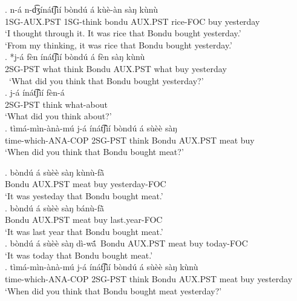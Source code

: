 \documentclass{assets/fieldnotes}
\begin{document}

\exg. n-á n-d͡ʒínát͡ʃìí bòndú á kùè-àn sàŋ kùnù\\
1SG-AUX.PST 1SG-think bondu AUX.PST rice-FOC buy yesterday\\
`I thought through it. It was rice that Bondu bought yesterday.' \\  
`From my thinking, it was rice that Bondu bought yesterday.' \\ 

\exg. *j-á fèn ínát͡ʃìí bòndú á fèn sàŋ kùnù \\
2SG-PST what think Bondu AUX.PST what buy yesterday\\\
`What did you think that Bondu bought yesterday?' \\  

\exg. j-á ínát͡ʃìí fèn-á \\
2SG-PST think what-about\\
`What did you think about?' \\  

\exg. tìmá-mìn-ànà-mú j-á ínát͡ʃìí bòndú á sùèè sàŋ \\
time-which-ANA-COP 2SG-PST think Bondu AUX.PST meat buy\\
`When did you think that Bondu bought meat?'\\  


\exg. bòndú á sùèè sàŋ kùnù-fã̀\\
Bondu AUX.PST meat buy yesterday-FOC\\
`It was yesteday that Bondu bought meat.'\\  

\exg. bòndú á sùèè sàŋ bánù-fã̀\\
Bondu AUX.PST meat buy last.year-FOC\\
`It was last year that Bondu bought meat.'\\  

\exg. bòndú á sùèè sàŋ dì-wã́\
Bondu AUX.PST meat buy today-FOC\\
`It was today that Bondu bought meat.'\\  

\exg. tìmá-mìn-ànà-mú j-á ínát͡ʃìí bòndú á sùèè sàŋ kùnù\\
time-which-ANA-COP 2SG-PST think Bondu AUX.PST meat buy yesterday\\
`When did you think that Bondu bought meat yesterday?' \\ 
\end{document}
